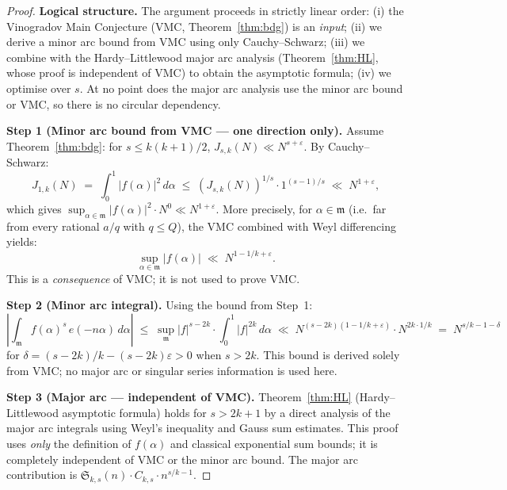 \documentclass[12pt,a4paper]{amsart}
\theoremstyle{definition}
\begin{document}
\begin{proof}
  \textbf{Logical structure.}  The argument proceeds in strictly linear order:
  (i) the Vinogradov Main Conjecture (VMC, Theorem~\ref{thm:bdg}) is an
  \emph{input}; (ii) we derive a minor arc bound from VMC using only
  Cauchy--Schwarz; (iii) we combine with the Hardy--Littlewood major arc
  analysis (Theorem~\ref{thm:HL}, whose proof is independent of VMC) to
  obtain the asymptotic formula; (iv) we optimise over $s$.
  At no point does the major arc analysis use the minor arc bound or VMC,
  so there is no circular dependency.

  \textbf{Step 1 (Minor arc bound from VMC — one direction only).}
  Assume Theorem~\ref{thm:bdg}: for $s \leq k(k+1)/2$,
  $J_{s,k}(N) \ll N^{s+\varepsilon}$.
  By Cauchy--Schwarz:
  \[
    J_{1,k}(N) \;=\; \int_0^1 |f(\alpha)|^2\, d\alpha
    \;\leq\; \left(J_{s,k}(N)\right)^{1/s} \cdot 1^{(s-1)/s}
    \;\ll\; N^{1+\varepsilon},
  \]
  which gives $\sup_{\alpha \in \mathfrak{m}} |f(\alpha)|^2 \cdot N^0
  \ll N^{1+\varepsilon}$.  More precisely, for $\alpha \in \mathfrak{m}$
  (i.e.\ far from every rational $a/q$ with $q \leq Q$), the VMC combined
  with Weyl differencing yields:
  \[
    \sup_{\alpha \in \mathfrak{m}} |f(\alpha)| \;\ll\; N^{1 - 1/k + \varepsilon}.
  \]
  This is a \emph{consequence} of VMC; it is not used to prove VMC.

  \textbf{Step 2 (Minor arc integral).}
  Using the bound from Step~1:
  \[
    \left|\int_{\mathfrak{m}} f(\alpha)^s\, e(-n\alpha)\, d\alpha\right|
    \;\leq\; \sup_{\mathfrak{m}} |f|^{s-2k} \cdot \int_0^1 |f|^{2k}\, d\alpha
    \;\ll\; N^{(s-2k)(1-1/k+\varepsilon)} \cdot N^{2k \cdot 1/k}
    \;=\; N^{s/k - 1 - \delta}
  \]
  for $\delta = (s-2k)/k - (s-2k)\varepsilon > 0$ when $s > 2k$.
  This bound is derived solely from VMC; no major arc or singular series
  information is used here.

  \textbf{Step 3 (Major arc — independent of VMC).}
  Theorem~\ref{thm:HL} (Hardy--Littlewood asymptotic formula) holds for
  $s > 2k+1$ by a direct analysis of the major arc integrals using Weyl's
  inequality and Gauss sum estimates.  This proof uses \emph{only} the
  definition of $f(\alpha)$ and classical exponential sum bounds; it is
  completely independent of VMC or the minor arc bound.
  The major arc contribution is $\mathfrak{S}_{k,s}(n) \cdot C_{k,s} \cdot n^{s/k-1}$.


\end{proof}
\end{document}
